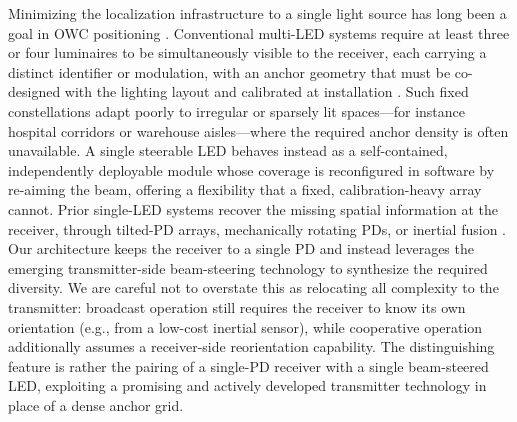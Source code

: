 \documentclass[journal]{IEEEtran}
\begin{document}
Minimizing the localization infrastructure to a single light source has long been a goal in OWC positioning \cite{Zhu2025, Rekkas2023}. Conventional multi-LED systems require at least three or four luminaires to be simultaneously visible to the receiver, each carrying a distinct identifier or modulation, with an anchor geometry that must be co-designed with the lighting layout and calibrated at installation \cite{Wang2024b, Cossu2022}. Such fixed constellations adapt poorly to irregular or sparsely lit spaces---for instance hospital corridors or warehouse aisles---where the required anchor density is often unavailable. A single steerable LED behaves instead as a self-contained, independently deployable module whose coverage is reconfigured in software by re-aiming the beam, offering a flexibility that a fixed, calibration-heavy array cannot. Prior single-LED systems recover the missing spatial information at the receiver, through tilted-PD arrays, mechanically rotating PDs, or inertial fusion \cite{Qin2020, Li2024, Ma2024, Liu2022, Shi2025, ShiJin2025}. Our architecture keeps the receiver to a single PD and instead leverages the emerging transmitter-side beam-steering technology to synthesize the required diversity. We are careful not to overstate this as relocating all complexity to the transmitter: broadcast operation still requires the receiver to know its own orientation (e.g., from a low-cost inertial sensor), while cooperative operation additionally assumes a receiver-side reorientation capability. The distinguishing feature is rather the pairing of a single-PD receiver with a single beam-steered LED, exploiting a promising and actively developed transmitter technology in place of a dense anchor grid.
\end{document}
